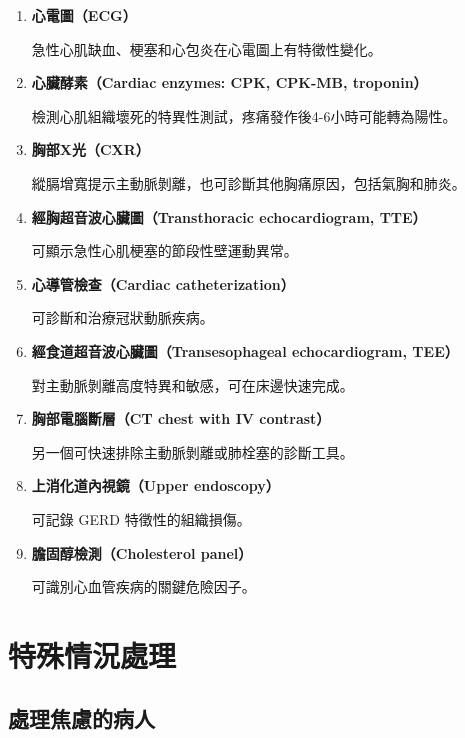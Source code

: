 \documentclass[12pt,a4paper]{article}
\begin{document}
\begin{enumerate}
    \item \textbf{心電圖（ECG）}
    
    急性心肌缺血、梗塞和心包炎在心電圖上有特徵性變化。
    
    \item \textbf{心臟酵素（Cardiac enzymes: CPK, CPK-MB, troponin）}
    
    檢測心肌組織壞死的特異性測試，疼痛發作後4-6小時可能轉為陽性。
    
    \item \textbf{胸部X光（CXR）}
    
    縱膈增寬提示主動脈剝離，也可診斷其他胸痛原因，包括氣胸和肺炎。
    
    \item \textbf{經胸超音波心臟圖（Transthoracic echocardiogram, TTE）}
    
    可顯示急性心肌梗塞的節段性壁運動異常。
    
    \item \textbf{心導管檢查（Cardiac catheterization）}
    
    可診斷和治療冠狀動脈疾病。
    
    \item \textbf{經食道超音波心臟圖（Transesophageal echocardiogram, TEE）}
    
    對主動脈剝離高度特異和敏感，可在床邊快速完成。
    
    \item \textbf{胸部電腦斷層（CT chest with IV contrast）}
    
    另一個可快速排除主動脈剝離或肺栓塞的診斷工具。
    
    \item \textbf{上消化道內視鏡（Upper endoscopy）}
    
    可記錄 GERD 特徵性的組織損傷。
    
    \item \textbf{膽固醇檢測（Cholesterol panel）}
    
    可識別心血管疾病的關鍵危險因子。
\end{enumerate}

\section{特殊情況處理}

\subsection{處理焦慮的病人}
\end{document}
